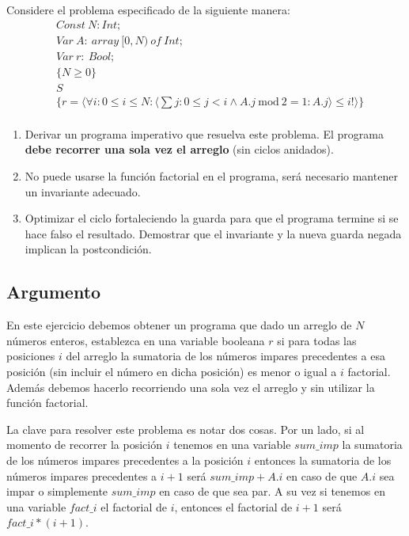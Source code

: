 \documentclass[12pt, a4paper, openany, fleqn]{book}
\begin{document}
    Considere el problema especificado de la siguiente manera:
    \begin{align*}
        &Const\ N: Int;\\
        &Var\ A:\ array\ [0, N)\ of\ Int;\\
        &Var\ r:\ Bool;\\
        &\{N \geqslant 0\}\\
        &    S\\
        &\{r = \langle\forall i : 0 \leqslant i \leqslant N : \langle\sum j : 0 \leqslant j < i \land A.j\ \text{mod}\ 2 = 1 : A.j\rangle \leqslant i! \rangle \}\\
    \end{align*}

    \begin{enumerate}
        \item Derivar un programa imperativo que resuelva este problema. El programa \textbf{debe recorrer una sola vez el arreglo} (sin ciclos anidados).
        \item No puede usarse la función factorial en el programa, será necesario mantener un invariante adecuado.
        \item Optimizar el ciclo fortaleciendo la guarda para que el programa termine si se hace falso el resultado. Demostrar que el invariante y la nueva guarda negada implican la postcondición.
    \end{enumerate}

    \subsection*{Argumento}
    En este ejercicio debemos obtener un programa que dado un arreglo de $N$ números enteros, establezca en una variable booleana $r$ si para todas las posiciones $i$ del arreglo la sumatoria de los números impares precedentes a esa posición (sin incluir el número en dicha posición) es menor o igual a $i$ factorial. Además debemos hacerlo recorriendo una sola vez el arreglo y sin utilizar la función factorial.

    La clave para resolver este problema es notar dos cosas. Por un lado, si al momento de recorrer la posición $i$ tenemos en una variable $sum\_imp$ la sumatoria de los números impares precedentes a la posición $i$ entonces la sumatoria de los números impares precedentes a $i+1$ será $sum\_imp + A.i$ en caso de que $A.i$ sea impar o simplemente $sum\_imp$ en caso de que sea par.
    A su vez si tenemos en una variable $fact\_i$ el factorial de $i$, entonces el factorial de $i+1$ será  $fact\_i * (i+1)$.
\end{document}
